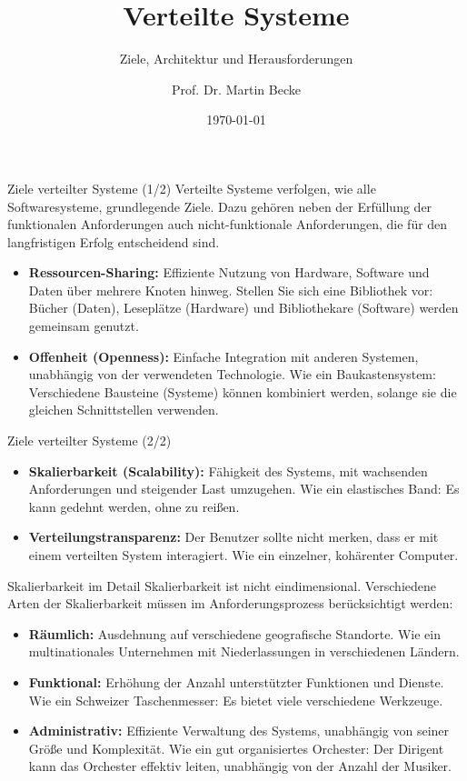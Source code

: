 \documentclass{beamer}
\title{Verteilte Systeme}
\subtitle{Ziele, Architektur und Herausforderungen}
\author{Prof. Dr. Martin Becke}
\date{\today}
\begin{document}
\begin{frame}
    \titlepage
\end{frame}


\begin{frame}{Ziele verteilter Systeme (1/2)}
    Verteilte Systeme verfolgen, wie alle Softwaresysteme, grundlegende Ziele.  Dazu gehören neben der Erfüllung der funktionalen Anforderungen auch nicht-funktionale Anforderungen, die für den langfristigen Erfolg entscheidend sind.

    \begin{itemize}
        \item \textbf{Ressourcen-Sharing:}  Effiziente Nutzung von Hardware, Software und Daten über mehrere Knoten hinweg. Stellen Sie sich eine Bibliothek vor:  Bücher (Daten), Leseplätze (Hardware) und Bibliothekare (Software) werden gemeinsam genutzt.
        \item \textbf{Offenheit (Openness):} Einfache Integration mit anderen Systemen, unabhängig von der verwendeten Technologie. Wie ein Baukastensystem:  Verschiedene Bausteine (Systeme) können kombiniert werden, solange sie die gleichen Schnittstellen verwenden.
    \end{itemize}
\end{frame}


\begin{frame}{Ziele verteilter Systeme (2/2)}
    \begin{itemize}
        \item \textbf{Skalierbarkeit (Scalability):}  Fähigkeit des Systems, mit wachsenden Anforderungen und steigender Last umzugehen.  Wie ein elastisches Band: Es kann gedehnt werden, ohne zu reißen.
        \item \textbf{Verteilungstransparenz:}  Der Benutzer sollte nicht merken, dass er mit einem verteilten System interagiert.  Wie ein einzelner, kohärenter Computer.
    \end{itemize}
\end{frame}


\begin{frame}{Skalierbarkeit im Detail}
    Skalierbarkeit ist nicht eindimensional.  Verschiedene Arten der Skalierbarkeit müssen im Anforderungsprozess berücksichtigt werden:

    \begin{itemize}
        \item \textbf{Räumlich:}  Ausdehnung auf verschiedene geografische Standorte.  Wie ein multinationales Unternehmen mit Niederlassungen in verschiedenen Ländern.
        \item \textbf{Funktional:}  Erhöhung der Anzahl unterstützter Funktionen und Dienste. Wie ein Schweizer Taschenmesser: Es bietet viele verschiedene Werkzeuge.
        \item \textbf{Administrativ:}  Effiziente Verwaltung des Systems, unabhängig von seiner Größe und Komplexität. Wie ein gut organisiertes Orchester:  Der Dirigent kann das Orchester effektiv leiten, unabhängig von der Anzahl der Musiker.
    \end{itemize}
\end{frame}
\end{document}
